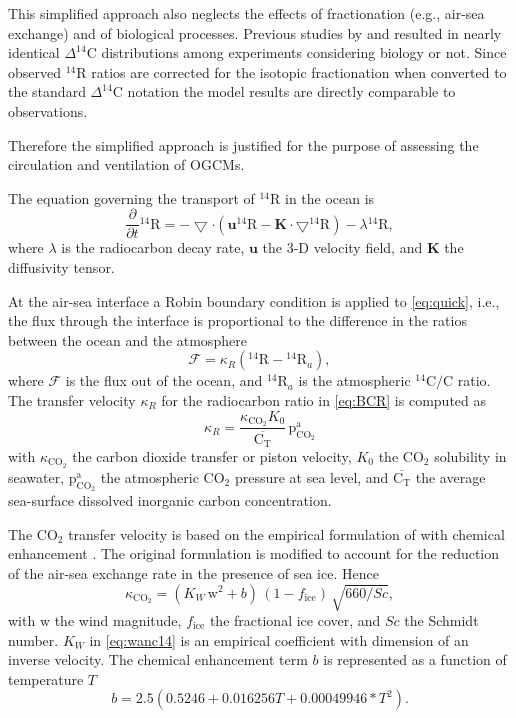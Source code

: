 \documentclass[../main/TOP_manual]{subfiles}
\newcommand{\cd}{\mathrm{CO_2}}
\newcommand{\Ct}{\mathrm{C_T}}
\newcommand{\pacd}{\mathrm{p^a_{CO_2}}}
\newcommand{\cq}{\mathrm{^{14}C}}
\newcommand{\Dcq}{\Delta ^{14}\mathrm{C}}
\newcommand{\Rq}{\mathrm{^{14}{R}}}
\begin{document}
This simplified approach also neglects the effects of fractionation (e.g.,  air-sea exchange) and of biological processes. Previous studies by \cite{bacastow_1990} and \cite{joos_1997} resulted in nearly identical $\Dcq$ distributions among experiments considering biology or not.
Since observed $\Rq$ ratios are corrected for the isotopic fractionation when converted to the standard $\Dcq$ notation \citep{stuiver_1977} the model results are directly comparable to observations.

Therefore the simplified approach is justified for the purpose of assessing the circulation and ventilation of OGCMs.

The equation governing the transport of $\Rq$  in the ocean is
\begin{equation}
\frac{\partial}{\partial t} {\Rq} =  - \bigtriangledown \cdot ( \mathbf{u} \Rq - \mathbf{K} \cdot \bigtriangledown \Rq )  - \lambda \Rq, \label{eq:quick}
\end{equation}
where $\lambda$ is the radiocarbon decay rate, ${\mathbf{u}}$ the 3-D velocity field, and $\mathbf{K}$ the diffusivity tensor.

At the air-sea interface a Robin boundary condition \citep{haine_2006} is applied to \eqref{eq:quick}, i.e., the flux
through the interface is proportional to the difference in the ratios between
the ocean and the atmosphere
\begin{equation}
\mathcal{\!F} =  \kappa_{R}  (\Rq  - \Rq_{a} ), \label{eq:BCR}
\end{equation}
where $\mathcal{\!F}$ is the flux out of the ocean, and $\Rq_{a}$ is the atmospheric $\cq/\mathrm{C}$ ratio. The transfer velocity $ \kappa_{R} $ for the radiocarbon ratio in \eqref{eq:BCR} is computed as
\begin{equation}
 \kappa_{R} =  \frac{\kappa_{\cd} K_0}{\overline{\Ct}} \, \pacd   \label{eq:Rspeed}
\end{equation}
with $\kappa_{\cd}$ the carbon dioxide transfer or piston velocity, $K_0$ the $\cd$ solubility in seawater, $\pacd$ the atmospheric $\cd$ pressure at sea level, and $\overline{\Ct}$ the average sea-surface dissolved inorganic carbon concentration.


The $\cd$ transfer velocity is based on the empirical formulation of \cite{wanninkhof_1992} with chemical enhancement \citep{wanninkhof_1996,wanninkhof_2014}. The original formulation is modified to account for the reduction of the  air-sea exchange rate in the presence of sea ice. Hence
\begin{equation}
\kappa_\cd=\left( K_W\,\mathrm{w}^2 + b  \right)\, (1-f_\mathrm{ice})\,\sqrt{660/Sc}, \label{eq:wanc14}
\end{equation}
with $\mathrm{w}$ the wind magnitude, $f_\mathrm{ice}$ the fractional ice cover, and $Sc$ the Schmidt number.
$K_W$ in \eqref{eq:wanc14} is an empirical coefficient with dimension of an inverse velocity.
The chemical enhancement term $b$ is represented as a function of temperature $T$ \citep{wanninkhof_1992}
\begin{equation}
b=2.5 ( 0.5246 + 0.016256 T+ 0.00049946  * T^2 ). \label{eq:wanchem}
\end{equation}
\end{document}
